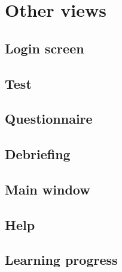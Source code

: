 \section{Other views}

\subsection{Login screen}

\subsection{Test}

\subsection{Questionnaire}

\subsection{Debriefing}

\subsection{Main window}

\subsection{Help}

\subsection{Learning progress}
\label{sec:learningprogress}

